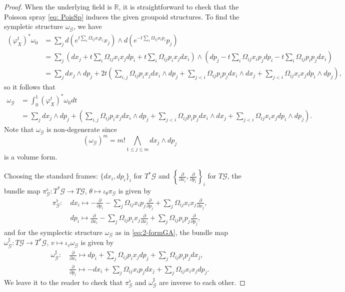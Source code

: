 \documentclass{amsart}
\numberwithin{equation}{section}
\newcommand{\cG}{\mathcal{G}}
\newcommand{\RR}{\mathbb{R}}
\begin{document}
\begin{proof}
  When the underlying field is $\RR$, it is straightforward to check that the Poisson spray \eqref{eq: PoisSp} induces the given groupoid structures. To find the sympletic structure $\omega_\cG$, we have
  \begin{align*}
    \left(\varphi_X^t\right)^*\omega_0 & = \sum_{j} d \left(e^{t \sum_{i} \Omega_{ij} x_ip_i}x_j \right) \wedge d \left(e^{-t \sum_{i} \Omega_{ij} x_ip_i}p_j \right) \\
    & = \sum_{j} \left(d x_j + t \sum_{i} \Omega_{ij} x_i x_j dp_i + t \sum_{i} \Omega_{ij} p_i x_j dx_i \right) \wedge \left(d p_j - t \sum_{i} \Omega_{ij} x_i p_j dp_i - t \sum_{i} \Omega_{ij} p_i p_j dx_i \right) \\
    & = \sum_{j} dx_j \wedge dp_j + 2t \left( \sum_{i, j} \Omega_{ij}p_i x_j d x_i \wedge d p_j  + \sum_{j < i} \Omega_{ij}p_ip_j d x_i \wedge d x_j + \sum_{j < i} \Omega_{ij}x_ix_j d p_i \wedge d p_j \right),
  \end{align*}
  so it follows that
  \begin{align*}
    \omega_\cG & = \int_{0}^{1} (\varphi_X^t)^*\omega_0 dt \\
    & = \sum_{j} dx_j \wedge dp_j
      + \left(
	\sum_{i, j} \Omega_{ij}p_ix_j dx_i \wedge dp_j 
	+ \sum_{j < i} \Omega_{ij}p_ip_j dx_i \wedge dx_j
	+ \sum_{j < i} \Omega_{ij}x_ix_j dp_i \wedge dp_j
      \right).
  \end{align*}
  Note that $\omega_\cG$ is non-degenerate since
  \[(\omega_\cG)^m = m! \bigwedge\limits_{1\leq j\leq m} dx_j \wedge dp_j\]
  is a volume form.

  Choosing the standard frames: $\{dx_i, dp_i\}_i$ for $T^*\cG$ and $\left\{\frac{\partial}{\partial x_i}, \frac{\partial}{\partial p_i}\right\}_i$ for $T\cG$, the bundle map $\pi_\cG^\flat: T^*\cG \to T\cG$, $\theta \mapsto \iota_\theta \pi_\cG$ is given by
  \begin{align*}
    \pi_\cG^\flat: &~ dx_i \mapsto -\frac{\partial}{\partial p_i} - \sum_{j} \Omega_{ij} x_i p_j \frac{\partial}{\partial p_j}+ \sum_{j} \Omega_{ij} x_i x_j \frac{\partial}{\partial x_j}, \\
    &~ dp_i \mapsto \frac{\partial}{\partial x_i} - \sum_{j} \Omega_{ij} p_i x_j \frac{\partial}{\partial x_j}+ \sum_{j} \Omega_{ij} p_i p_j \frac{\partial}{\partial p_j},
  \end{align*}
  and for the symplectic structure $\omega_\cG$ as in \eqref{eq:2-formGA}, the bundle map $\omega_\cG^\sharp: T\cG \to T^*\cG$, $v \mapsto \iota_v \omega_\cG$ is given by
  \begin{align*}
    \omega_\cG^\sharp: &~ \frac{\partial}{\partial x_i} \mapsto dp_i + \sum_{j} \Omega_{ij} p_i x_j dp_j + \sum_{j} \Omega_{ij} p_i p_j dx_j, \\
    &~ \frac{\partial}{\partial p_i} \mapsto -dx_i + \sum_{j} \Omega_{ij} x_i p_j dx_j + \sum_{j} \Omega_{ij} x_i x_j dp_j.
  \end{align*}
  We leave it to the reader to check that $\pi_\cG^\flat$ and $\omega_\cG^\sharp$ are inverse to each other.


\end{proof}
\end{document}
